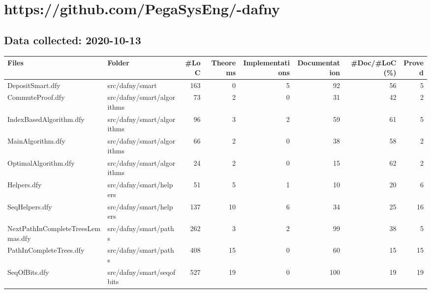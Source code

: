 \documentclass[a4paper, 12pt]{article}
\begin{document}
\section*{https://github.com/PegaSysEng/-dafny}
\subsection*{Data collected: 2020-10-13}
\scriptsize
\begin{tabular}{llrrrrrr}
\toprule
                             Files &                          Folder &  \#LoC &  Theorems &  Implementations &  Documentation &  \#Doc/\#LoC (\%) &  Proved \\
\midrule
                  DepositSmart.dfy &                 src/dafny/smart &   163 &         0 &                5 &             92 &             56 &       5 \\
                  CommuteProof.dfy &      src/dafny/smart/algorithms &    73 &         2 &                0 &             31 &             42 &       2 \\
           IndexBasedAlgorithm.dfy &      src/dafny/smart/algorithms &    96 &         3 &                2 &             59 &             61 &       5 \\
                 MainAlgorithm.dfy &      src/dafny/smart/algorithms &    66 &         2 &                0 &             38 &             58 &       2 \\
              OptimalAlgorithm.dfy &      src/dafny/smart/algorithms &    24 &         2 &                0 &             15 &             62 &       2 \\
                       Helpers.dfy &         src/dafny/smart/helpers &    51 &         5 &                1 &             10 &             20 &       6 \\
                    SeqHelpers.dfy &         src/dafny/smart/helpers &   137 &        10 &                6 &             34 &             25 &      16 \\
 NextPathInCompleteTreesLemmas.dfy &           src/dafny/smart/paths &   262 &         3 &                2 &             99 &             38 &       5 \\
           PathInCompleteTrees.dfy &           src/dafny/smart/paths &   408 &        15 &                0 &             60 &             15 &      15 \\
                     SeqOfBits.dfy &       src/dafny/smart/seqofbits &   527 &        19 &                0 &            100 &             19 &      19 \\

\end{tabular}
\end{document}
